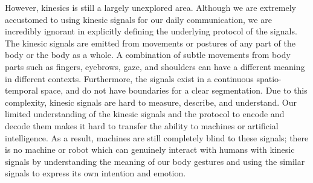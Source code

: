 
However, kinesics is still a largely unexplored area. Although we are extremely accustomed to using kinesic signals for our daily communication, we are incredibly ignorant in explicitly defining the underlying protocol of the signals. The kinesic signals are emitted from movements or postures of any part of the body or the body as a whole. A combination of subtle movements from body parts such as fingers, eyebrows, gaze, and shoulders can have a different meaning in different contexts. Furthermore, the signals exist in a continuous spatio-temporal space, and do not have boundaries for a clear segmentation. Due to this complexity, kinesic signals are hard to measure, describe, and understand. Our limited understanding of the kinesic signals and the protocol to encode and decode them makes it hard to transfer the ability to machines or artificial intelligence. As a result, machines are still completely blind to these signals; there is no machine or robot which can genuinely interact with humans with kinesic signals by understanding the meaning of our body gestures and using the similar signals to express its own intention and emotion. 




